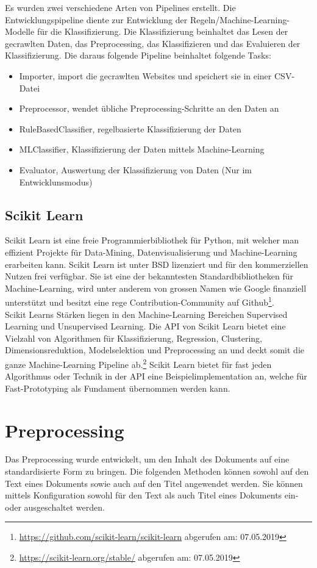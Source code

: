 Es wurden zwei verschiedene Arten von Pipelines erstellt.
Die Entwicklungspipeline diente zur Entwicklung der Regeln/Machine-Learning-Modelle für die Klassifizierung.
Die Klassifizierung beinhaltet das Lesen der gecrawlten Daten, das Preprocessing, das Klassifizieren und das Evaluieren der Klassifizierung.
Die daraus folgende Pipeline beinhaltet folgende Tasks:
\begin{itemize}
	\item Importer, import die gecrawlten Websites und speichert sie in einer CSV-Datei
	\item Preprocessor, wendet übliche Preprocessing-Schritte an den Daten an
	\item RuleBasedClassifier, regelbasierte Klassifizierung der Daten 
	\item MLClassifier, Klassifizierung der Daten mittels Machine-Learning
	\item Evaluator, Auswertung der Klassifizierung von Daten (Nur im Entwicklunsmodus)
\end{itemize}
\subsection{Scikit Learn}
Scikit Learn ist eine freie Programmierbibliothek für Python, mit welcher man effizient Projekte für Data-Mining, Datenvisualisierung und Machine-Learning erarbeiten kann.
Scikit Learn ist unter BSD lizenziert und für den kommerziellen Nutzen frei verfügbar.
Sie ist eine der bekanntesten Standardbibliotheken für Machine-Learning, wird unter anderem von grossen Namen wie Google finanziell unterstützt und besitzt eine rege Contribution-Community auf Github\footnote{\url{https://github.com/scikit-learn/scikit-learn} abgerufen am: 07.05.2019}.\\
Scikit Learns Stärken liegen in den Machine-Learning Bereichen \glqq Supervised Learning\grqq{} und \glqq Unsupervised Learning\grqq{}.
Die API von Scikit Learn bietet eine Vielzahl von Algorithmen für Klassifizierung, Regression, Clustering, Dimensionsreduktion, Modelselektion und Preprocessing an und deckt somit die ganze Machine-Learning Pipeline ab.\footnote{\url{https://scikit-learn.org/stable/} abgerufen am: 07.05.2019}
Scikit Learn bietet für fast jeden Algorithmus oder Technik in der API eine Beispielimplementation an, welche für Fast-Prototyping  als Fundament übernommen werden kann.
\section{Preprocessing}
Das Preprocessing wurde entwickelt, um den Inhalt des Dokuments auf eine standardisierte Form zu bringen.
Die folgenden Methoden können sowohl auf den Text eines Dokuments sowie auch auf den Titel angewendet werden.
Sie können mittels Konfiguration sowohl für den Text als auch Titel eines Dokuments ein- oder ausgeschaltet werden.
